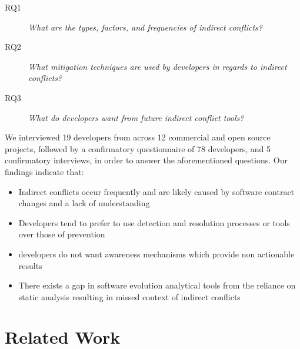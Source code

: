 \documentclass[conference]{IEEEtran}
\makeatletter
\def\namedlabel#1#2{\begingroup
   \def\@currentlabel{#2}%
   \label{#1}\endgroup
}
\makeatother
\begin{document}
\begin{description}
	\item[RQ1\namedlabel{itm:rq1}{RQ1}] \textit{What are the types, factors, and frequencies of indirect conflicts?}
	\item[RQ2\namedlabel{itm:rq2}{RQ2}] \textit{What mitigation techniques are used by developers in regards to indirect conflicts?}
	\item[RQ3\namedlabel{itm:rq3}{RQ3}] \textit{What do developers want from future indirect conflict tools?}
\end{description}

We interviewed 19 developers from across 12 commercial and open source projects, followed by a confirmatory questionnaire of 78
developers, and 5 confirmatory interviews, in order to answer the aforementioned questions. Our findings indicate that:
\begin{itemize}
	\item Indirect conflicts occur frequently and are likely caused by software contract changes and a lack of understanding
	\item Developers tend to prefer to use detection and resolution processes or tools over those of prevention
	\item developers do not want awareness mechanisms which provide non actionable results
	\item There exists a gap in software evolution analytical tools from the reliance on static analysis resulting in missed
				context of indirect conflicts
\end{itemize}

\section{Related Work}
\label{sec:related}
\end{document}
